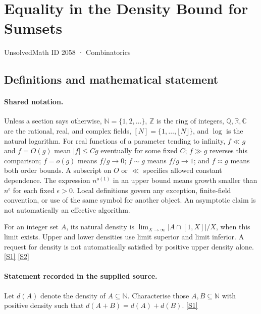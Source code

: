 \documentclass[11pt,a4paper]{article}
\newcommand{\N}{\mathbb{N}}
\newcommand{\Z}{\mathbb{Z}}
\newcommand{\Q}{\mathbb{Q}}
\newcommand{\R}{\mathbb{R}}
\newcommand{\C}{\mathbb{C}}
\newcommand{\sref}[2]{\hyperlink{source:#1:#2}{[S#2]}}
\begin{document}

\setcounter{section}{2057}

\section{Equality in the Density Bound for Sumsets}\label{2058}

{\small\sffamily UnsolvedMath ID 2058 · Combinatorics}

\subsection{Definitions and mathematical statement}

\paragraph{Shared notation.}Unless a section says otherwise, $\N=\{1,2,\ldots\}$,
$\Z$ is the ring of integers, $\Q,\R,\C$ are the rational, real, and complex
fields, $[N]=\{1,\ldots,\lfloor N\rfloor\}$, and $\log$ is the natural
logarithm. For real functions of a parameter tending to infinity,
$f\ll g$ and $f=O(g)$ mean $|f|\leq Cg$ eventually for some fixed $C$;
$f\gg g$ reverses this comparison; $f=o(g)$ means $f/g\to0$;
$f\sim g$ means $f/g\to1$; and $f\asymp g$ means both order bounds.
A subscript on $O$ or $\ll$ specifies allowed constant dependence.
The expression $n^{o(1)}$ in an upper bound means growth smaller than
$n^\epsilon$ for each fixed $\epsilon>0$. Local definitions govern any
exception, finite-field convention, or use of the same symbol for another
object. An asymptotic claim is not automatically an effective algorithm.



For an integer set $A$, its natural density is $\lim_{X\to\infty}|A\cap[1,X]|/X$, when this limit exists. Upper and lower densities use limit superior and limit inferior. A request for density is not automatically satisfied by positive upper density alone. \sref{2058}{1} \sref{2058}{2}

\paragraph{Statement recorded in the supplied source.}
Let $d(A)$ denote the density of $A\subseteq \mathbb{N}$. Characterise those $A,B\subseteq \mathbb{N}$ with positive density such that $ d(A+B)=d(A)+d(B). $ \sref{2058}{1}
\end{document}
